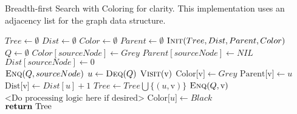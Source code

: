 \documentclass{article}
\begin{document}

\begin{algorithm}[H]
    \caption{
        Breadth-first Search with Coloring for clarity. This implementation
        uses an adjacency list for the graph data structure.
    }
    \label{alg:algorithm-label}
    \begin{algorithmic}[1]
         
            \State $ Tree \gets \emptyset $            
            \State $ Dist \gets \emptyset $
            \State $ Color \gets \emptyset $
            \State $ Parent \gets \emptyset $            
            \State $ \Call{Init}{Tree, Dist, Parent, Color} $
            \\
            \State $ Q \gets \emptyset $
            \State $ Color[sourceNode] \gets Grey $
            \State $ Parent[sourceNode] \gets NIL $
            \State $ Dist[sourceNode] \gets 0 $
            \\
            \State $ \Call{Enq}{Q, sourceNode} $
                \State $ u \gets \Call{Deq}{Q} $
                        \State $ \Call{Visit}{\text{v}} $
                        \State $ \text{Color[v]} \gets Grey $
                        \State $ \text{Parent[v]} \gets u $
                        \State $ \text{Dist[v]} \gets Dist[u] + 1 $
                        \State $ Tree \gets Tree \bigcup \{(u, \text{v})\} $
                        \State $ \Call{Enq}{Q, \text{v}} $
                    \Else
                        \State $ \text{<Do processing logic here if desired>} $
                    \EndIf                                    
                \EndFor                
                \State $ \text{Color[}u\text{]} \gets Black $                
            \EndWhile
            \\
            \State $ \Return \text{ Tree} $
        \EndFunction
    \end{algorithmic}
\end{algorithm}
\end{document}
